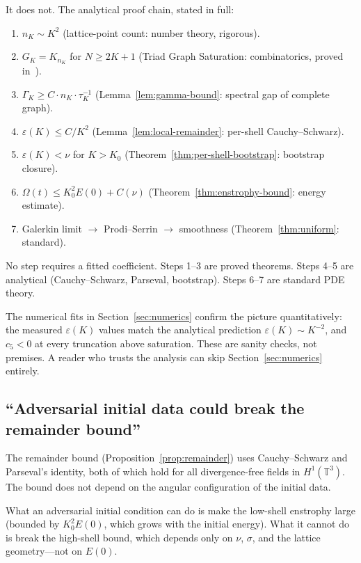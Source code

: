 \documentclass[11pt,a4paper]{article}
\theoremstyle{remark}
\newcommand{\T}{\mathbb{T}}
\begin{document}
It does not.  The analytical proof chain, stated in full:
\begin{enumerate}
\item $n_K \sim K^2$ (lattice-point count: number theory, rigorous).
\item $G_K = K_{n_K}$ for $N \geq 2K+1$ (Triad Graph Saturation: combinatorics, proved in~\cite{higgins2026cascade}).
\item $\Gamma_K \geq C \cdot n_K \cdot \tau_K^{-1}$ (Lemma~\ref{lem:gamma-bound}: spectral gap of complete graph).
\item $\varepsilon(K) \leq C/K^2$ (Lemma~\ref{lem:local-remainder}: per-shell Cauchy--Schwarz).
\item $\varepsilon(K) < \nu$ for $K > K_0$ (Theorem~\ref{thm:per-shell-bootstrap}: bootstrap closure).
\item $\Omega(t) \leq K_0^2 E(0) + C(\nu)$ (Theorem~\ref{thm:enstrophy-bound}: energy estimate).
\item Galerkin limit $\to$ Prodi--Serrin $\to$ smoothness (Theorem~\ref{thm:uniform}: standard).
\end{enumerate}
No step requires a fitted coefficient.  Steps 1--3 are proved theorems.  Steps 4--5 are analytical (Cauchy--Schwarz, Parseval, bootstrap).  Steps 6--7 are standard PDE theory.

The numerical fits in Section~\ref{sec:numerics} confirm the picture quantitatively: the measured $\varepsilon(K)$ values match the analytical prediction $\varepsilon(K) \sim K^{-2}$, and $c_5 < 0$ at every truncation above saturation.  These are sanity checks, not premises.  A reader who trusts the analysis can skip Section~\ref{sec:numerics} entirely.

\subsection{``Adversarial initial data could break the remainder bound''}

The remainder bound (Proposition~\ref{prop:remainder}) uses Cauchy--Schwarz and Parseval's identity, both of which hold for all divergence-free fields in $H^1(\T^3)$.  The bound does not depend on the angular configuration of the initial data.

What an adversarial initial condition can do is make the low-shell enstrophy large (bounded by $K_0^2 E(0)$, which grows with the initial energy).  What it cannot do is break the high-shell bound, which depends only on $\nu$, $\sigma$, and the lattice geometry---not on $E(0)$.
\end{document}
